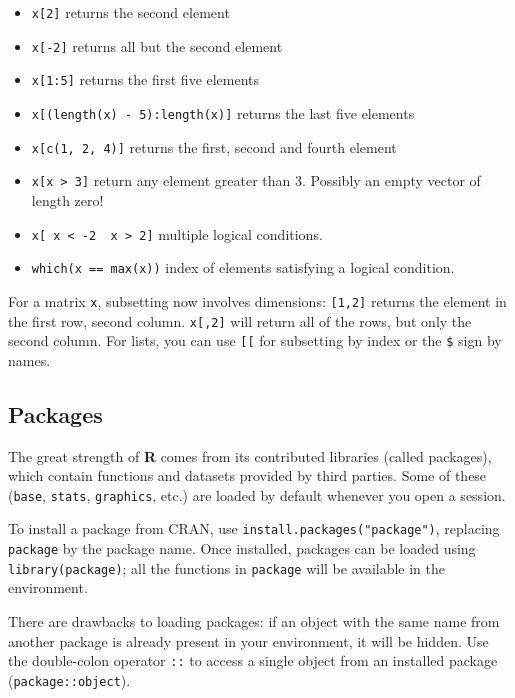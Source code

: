 \documentclass[
  11pt,
  letterpaper,
]{book}
\makeatletter
\providecommand{\tightlist}{%
  \setlength{\itemsep}{0pt}\setlength{\parskip}{0pt}}
\newenvironment{kframe}{%
\medskip{}
\setlength{\fboxsep}{.8em}
 \def\at@end@of@kframe{}%
 \ifinner\ifhmode%
  \def\at@end@of@kframe{\end{minipage}}%
  \begin{minipage}{\columnwidth}%
 \fi\fi%
 \def\FrameCommand##1{\hskip\@totalleftmargin \hskip-\fboxsep
 \colorbox{shadecolor}{##1}\hskip-\fboxsep
     \hskip-\linewidth \hskip-\@totalleftmargin \hskip\columnwidth}%
 \MakeFramed {\advance\hsize-\width
   \@totalleftmargin\z@ \linewidth\hsize
   \@setminipage}}%
 {\par\unskip\endMakeFramed%
 \at@end@of@kframe}
\newenvironment{rmdblock}[1]
  {
  \begin{itemize}
  \renewcommand{\labelitemi}{
    \raisebox{-.7\height}[0pt][0pt]{
      {\setkeys{Gin}{width=3em,keepaspectratio}\texttt{[image: images/\#1]}}
    }
  }
  \setlength{\fboxsep}{1em}
  \begin{kframe}
  \item
  }
  {
  \end{kframe}
  \end{itemize}
  }
\newenvironment{rmdcaution}
  {\begin{rmdblock}{caution}}
  {\end{rmdblock}}
\theoremstyle{definition}
\theoremstyle{definition}
\theoremstyle{definition}
\theoremstyle{remark}
\makeatother
\begin{document}
\begin{itemize}
\tightlist
\item
  \texttt{x{[}2{]}} returns the second element
\item
  \texttt{x{[}-2{]}} returns all but the second element
\item
  \texttt{x{[}1:5{]}} returns the first five elements
\item
  \texttt{x{[}(length(x)\ -\ 5):length(x){]}} returns the last five elements
\item
  \texttt{x{[}c(1,\ 2,\ 4){]}} returns the first, second and fourth element
\item
  \texttt{x{[}x\ \textgreater{}\ 3{]}} return any element greater than 3. Possibly an empty vector of length zero!
\item
  \texttt{x{[}\ x\ \textless{}\ -2\ \textbar{}\ x\ \textgreater{}\ 2{]}} multiple logical conditions.
\item
  \texttt{which(x\ ==\ max(x))} index of elements satisfying a logical condition.
\end{itemize}

For a matrix \texttt{x}, subsetting now involves dimensions: \texttt{{[}1,2{]}} returns the element in the first row, second column. \texttt{x{[},2{]}} will return all of the rows, but only the second column. For lists, you can use \texttt{{[}{[}} for subsetting by index or the \texttt{\$} sign by names.

\hypertarget{packages}{%
\subsection{Packages}\label{packages}}

The great strength of \textbf{R} comes from its contributed libraries (called packages), which contain functions and datasets provided by third parties. Some of these (\texttt{base}, \texttt{stats}, \texttt{graphics}, etc.) are loaded by default whenever you open a session.

To install a package from CRAN, use \texttt{install.packages("package")}, replacing \texttt{package} by the package name. Once installed, packages can be loaded using \texttt{library(package)}; all the functions in \texttt{package} will be available in the environment.

\begin{rmdcaution}
There are drawbacks to loading packages: if an object with the same name from another package is already present in your environment, it will be hidden. Use the double-colon operator \texttt{::} to access a single object from an installed package (\texttt{package::object}).
\end{rmdcaution}
\end{document}
